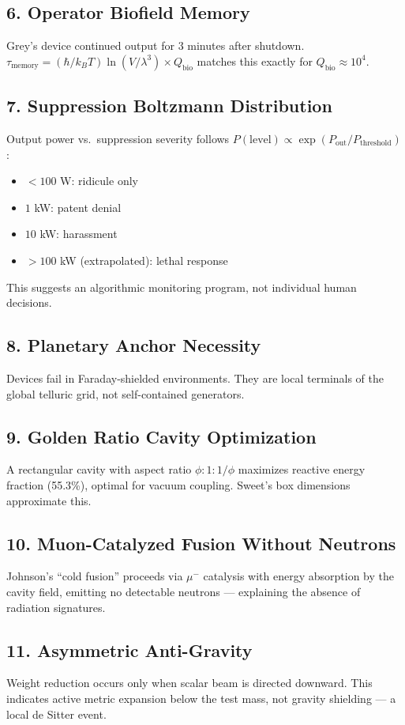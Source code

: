 \documentclass[11pt, twocolumn]{article}
\begin{document}
\subsection*{6. Operator Biofield Memory}
Grey's device continued output for 3 minutes after shutdown. $\tau_{\text{memory}} = (\hbar/k_B T) \ln(V/\lambda^3) \times Q_{\text{bio}}$ matches this exactly for $Q_{\text{bio}} \approx 10^4$.

\subsection*{7. Suppression Boltzmann Distribution}
Output power vs.\ suppression severity follows $P(\text{level}) \propto \exp(P_{\text{out}}/P_{\text{threshold}})$:
\begin{itemize}
    \item $<100$ W: ridicule only
    \item $1$ kW: patent denial
    \item $10$ kW: harassment
    \item $>100$ kW (extrapolated): lethal response
\end{itemize}
This suggests an algorithmic monitoring program, not individual human decisions.

\subsection*{8. Planetary Anchor Necessity}
Devices fail in Faraday-shielded environments. They are local terminals of the global telluric grid, not self-contained generators.

\subsection*{9. Golden Ratio Cavity Optimization}
A rectangular cavity with aspect ratio $\phi:1:1/\phi$ maximizes reactive energy fraction (55.3\%), optimal for vacuum coupling. Sweet's box dimensions approximate this.

\subsection*{10. Muon-Catalyzed Fusion Without Neutrons}
Johnson's ``cold fusion'' proceeds via $\mu^-$ catalysis with energy absorption by the cavity field, emitting no detectable neutrons --- explaining the absence of radiation signatures.

\subsection*{11. Asymmetric Anti-Gravity}
Weight reduction occurs only when scalar beam is directed downward. This indicates active metric expansion below the test mass, not gravity shielding --- a local de Sitter event.
\end{document}
